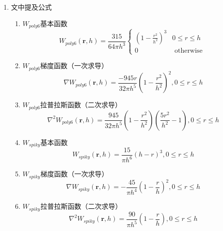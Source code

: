 \documentclass[printMode=false, declarePage=true]{ecnuthesis}
\begin{document}
\backmatter

\PrintReference

\begin{appendix}
  \begin{enumerate}
    \item 文中提及公式\label{formula}
    \begin{enumerate}
        \item $W_{poly6}$基本函数
            \begin{equation}
                W_{poly6}(\mathbf{r},h) = \frac{315}{64\pi h^3} \begin{cases}
             (1-\frac{r^2}{h^2})^3 & 0 \le r \le h\\
             0 & \text{ otherwise } 
            \end{cases}\label{con:poly6_1}
            \end{equation}
        \item $W_{poly6}$梯度函数（一次求导）
            \begin{equation}
                \nabla W_{poly6}(\mathbf{r},h) = \frac{-945r}{32\pi h^5} (1-\frac{r^2}{h^2})^2,0\le r \le h 
                \label{con:poly6_2}
            \end{equation}
        \item $W_{poly6}$拉普拉斯函数（二次求导）
            \begin{equation}
                \nabla^2 W_{poly6}(\mathbf{r},h) = \frac{945}{32\pi h^5} (1-\frac{r^2}{h^2})(\frac{5r^2}{h^2}-1 ),0\le r \le h 
                \label{con:poly6_3}
            \end{equation}
        \item $W_{spiky}$基本函数
            \begin{equation}
                W_{spiky}(\mathbf{r},h) = \frac{15}{\pi h^6} (h-r)^3,0\le r \le h 
                \label{con:spiky_1}
            \end{equation}
        \item $W_{spiky}$梯度函数（一次求导）
            \begin{equation}
                \nabla W_{spiky}(\mathbf{r},h) = - \frac{45}{\pi h^4} (1-\frac{r}{h})^2,0\le r \le h 
                \label{con:spiky_2}
            \end{equation}
        \item $W_{spiky}$拉普拉斯函数（二次求导）
            \begin{equation}
                \nabla^2 W_{spiky}(\mathbf{r},h) = \frac{90}{\pi h^5}(1-\frac{r}{h}),0\le r \le h 

\end{equation}
\end{enumerate}
\end{enumerate}
\end{appendix}
\end{document}
